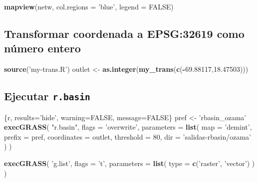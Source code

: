 \documentclass[11pt,]{article}
\newenvironment{Shaded}{\begin{snugshade}}{\end{snugshade}}
\newcommand{\KeywordTok}[1]{\textcolor[rgb]{0.13,0.29,0.53}{\textbf{#1}}}
\newcommand{\DataTypeTok}[1]{\textcolor[rgb]{0.13,0.29,0.53}{#1}}
\newcommand{\DecValTok}[1]{\textcolor[rgb]{0.00,0.00,0.81}{#1}}
\newcommand{\FloatTok}[1]{\textcolor[rgb]{0.00,0.00,0.81}{#1}}
\newcommand{\StringTok}[1]{\textcolor[rgb]{0.31,0.60,0.02}{#1}}
\newcommand{\OtherTok}[1]{\textcolor[rgb]{0.56,0.35,0.01}{#1}}
\newcommand{\OperatorTok}[1]{\textcolor[rgb]{0.81,0.36,0.00}{\textbf{#1}}}
\newcommand{\NormalTok}[1]{#1}
\begin{document}
\begin{Shaded}
\begin{Highlighting}[]
\KeywordTok{mapview}\NormalTok{(netw, }\DataTypeTok{col.regions =} \StringTok{'blue'}\NormalTok{, }\DataTypeTok{legend =} \OtherTok{FALSE}\NormalTok{)}
\end{Highlighting}
\end{Shaded}

\subsection{Transformar coordenada a EPSG:32619 como número
entero}\label{transformar-coordenada-a-epsg32619-como-nuxfamero-entero}

\begin{Shaded}
\begin{Highlighting}[]
\KeywordTok{source}\NormalTok{(}\StringTok{'my-trans.R'}\NormalTok{)}
\NormalTok{outlet <-}\StringTok{ }\KeywordTok{as.integer}\NormalTok{(}\KeywordTok{my_trans}\NormalTok{(}\KeywordTok{c}\NormalTok{(}\OperatorTok{-}\FloatTok{69.88117}\NormalTok{,}\FloatTok{18.47503}\NormalTok{)))}
\end{Highlighting}
\end{Shaded}

\subsection{\texorpdfstring{Ejecutar
\texttt{r.basin}}{Ejecutar r.basin}}\label{ejecutar-r.basin}

\begin{Shaded}
\begin{Highlighting}[]
\NormalTok{    \{r, results=}\StringTok{'hide'}\NormalTok{, warning=}\OtherTok{FALSE}\NormalTok{, message=}\OtherTok{FALSE}\NormalTok{\}}
\NormalTok{pref <-}\StringTok{ 'rbasin_ozama'}
\KeywordTok{execGRASS}\NormalTok{(}
  \StringTok{"r.basin"}\NormalTok{,}
  \DataTypeTok{flags =} \StringTok{'overwrite'}\NormalTok{,}
  \DataTypeTok{parameters =} \KeywordTok{list}\NormalTok{(}
    \DataTypeTok{map =} \StringTok{'demint'}\NormalTok{,}
    \DataTypeTok{prefix =}\NormalTok{ pref,}
    \DataTypeTok{coordinates =}\NormalTok{ outlet,}
    \DataTypeTok{threshold =} \DecValTok{80}\NormalTok{,}
    \DataTypeTok{dir =} \StringTok{'salidas-rbasin/ozama'}
\NormalTok{  )}
\NormalTok{)}
\end{Highlighting}
\end{Shaded}

\begin{Shaded}
\begin{Highlighting}[]
\KeywordTok{execGRASS}\NormalTok{(}
  \StringTok{'g.list'}\NormalTok{,}
  \DataTypeTok{flags =} \StringTok{'t'}\NormalTok{,}
  \DataTypeTok{parameters =} \KeywordTok{list}\NormalTok{(}
    \DataTypeTok{type =} \KeywordTok{c}\NormalTok{(}\StringTok{'raster'}\NormalTok{, }\StringTok{'vector'}\NormalTok{)}
\NormalTok{  )}
\NormalTok{)}
\end{Highlighting}
\end{Shaded}
\end{document}
